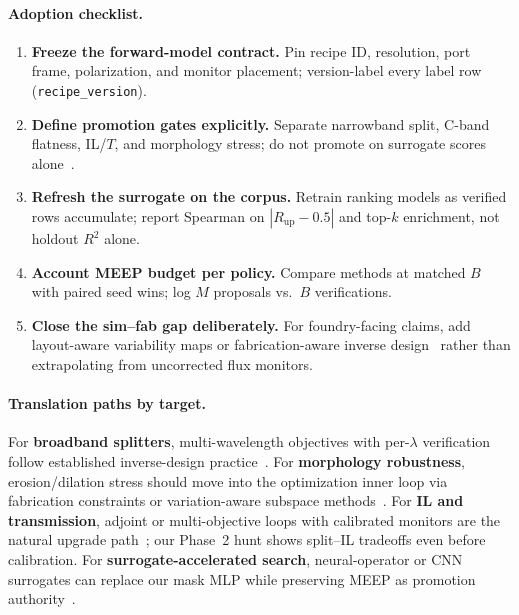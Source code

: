 \documentclass[11pt,a4paper]{article}
\begin{document}
\paragraph{Adoption checklist.}
\begin{enumerate}
  \item \textbf{Freeze the forward-model contract.} Pin recipe ID, resolution, port frame, polarization, and monitor placement; version-label every label row (\texttt{recipe\_version}).
  \item \textbf{Define promotion gates explicitly.} Separate narrowband split, C-band flatness, IL/$T$, and morphology stress; do not promote on surrogate scores alone~\cite{Jiang2021SurrogateReview,Frenkel2023NeuralOperator}.
  \item \textbf{Refresh the surrogate on the corpus.} Retrain ranking models as verified rows accumulate; report Spearman on $|R_{\mathrm{up}}-0.5|$ and top-$k$ enrichment, not holdout $R^2$ alone.
  \item \textbf{Account MEEP budget per policy.} Compare methods at matched $B$ with paired seed wins; log $M$ proposals vs.\ $B$ verifications.
  \item \textbf{Close the sim--fab gap deliberately.} For foundry-facing claims, add layout-aware variability maps or fabrication-aware inverse design~\cite{Xing2023SpatialVariation,Faid2024FabricationAware,BOSON2024} rather than extrapolating from uncorrected flux monitors.
\end{enumerate}

\paragraph{Translation paths by target.}
For \textbf{broadband splitters}, multi-wavelength objectives with per-$\lambda$ verification follow established inverse-design practice~\cite{Hansen2024BroadbandSplitters,Piggott2017FabricationConstrained}.
For \textbf{morphology robustness}, erosion/dilation stress should move into the optimization inner loop via fabrication constraints or variation-aware subspace methods~\cite{Piggott2017FabricationConstrained,Wolff2024FabricationTolerant,BOSON2024}.
For \textbf{IL and transmission}, adjoint or multi-objective loops with calibrated monitors are the natural upgrade path~\cite{Hughes2018AdjointNonlinear,Hammond2022MeepAdjoint}; our Phase~2 hunt shows split--IL tradeoffs even before calibration.
For \textbf{surrogate-accelerated search}, neural-operator or CNN surrogates can replace our mask MLP while preserving MEEP as promotion authority~\cite{Frenkel2023NeuralOperator,Su2021DeepSurrogate,SciRep2025CNNIBO}.
\end{document}
